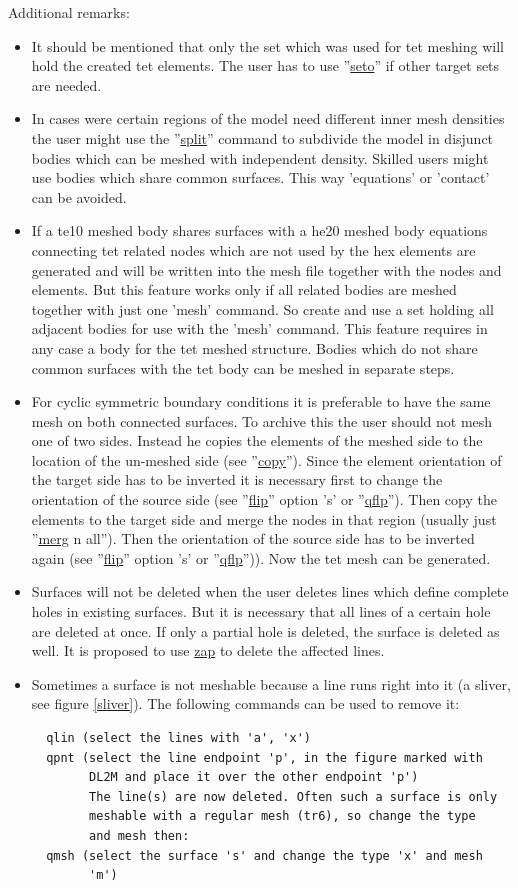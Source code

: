 \documentclass{article}
\providecommand{\htmlref}[2]{\hyperref[#2]{#1}}
\begin{document}
\begin{appendix}
Additional remarks:
\begin{itemize}
\item It should be mentioned that only the set which was used for tet meshing will hold the created tet elements. The user has to use ''\htmlref{seto}{seto}'' if other target sets are needed.
\item In cases were certain regions of the model need different inner mesh densities the user might use the  ''\htmlref{split}{split}'' command to subdivide the model in disjunct bodies which can be meshed with independent density. Skilled users might use bodies which share common surfaces. This way 'equations' or 'contact' can be avoided.
\item If a te10 meshed body shares surfaces with a he20 meshed body equations connecting tet related nodes which are not used by the hex elements are generated and will be written into the mesh file together with the nodes and elements. But this feature works only if all related bodies are meshed together with just one 'mesh' command. So create and use a set holding all adjacent bodies for use with the 'mesh' command. This feature requires in any case a body for the tet meshed structure. Bodies which do not share common surfaces with the tet body can be meshed in separate steps.
\item For cyclic symmetric boundary conditions it is preferable to have the same mesh on both connected surfaces. To archive this the user should not mesh one of two sides. Instead he copies the elements of the meshed side to the location of the un-meshed side (see ''\htmlref{copy}{copy}''). Since the element orientation of the target side has to be inverted it is necessary first to change the orientation of the source side (see ''\htmlref{flip}{flip}'' option 's' or ''\htmlref{qflp}{qflp}''). Then copy the elements to the target side and merge the nodes in that region (usually just ''\htmlref{merg}{merg} n all''). Then the orientation of the source side has to be inverted again (see ''\htmlref{flip}{flip}'' option 's' or ''\htmlref{qflp}{qflp}'')). Now the tet mesh can be generated.
\item Surfaces will not be deleted when the user deletes lines which define complete holes in existing surfaces. But it is necessary that all lines of a certain hole are deleted at once. If only a partial hole is deleted, the surface is deleted as well. It is proposed to use \htmlref{zap}{zap} to delete the affected lines.
\item Sometimes a surface is not meshable because a line runs right into it (a sliver, see figure \ref{sliver}). The following commands can be used to remove it:
\begin{verbatim}
  qlin (select the lines with 'a', 'x')
  qpnt (select the line endpoint 'p', in the figure marked with
        DL2M and place it over the other endpoint 'p')
        The line(s) are now deleted. Often such a surface is only
        meshable with a regular mesh (tr6), so change the type
        and mesh then:
  qmsh (select the surface 's' and change the type 'x' and mesh
        'm')
\end{verbatim}


\end{itemize}
\end{appendix}
\end{document}
